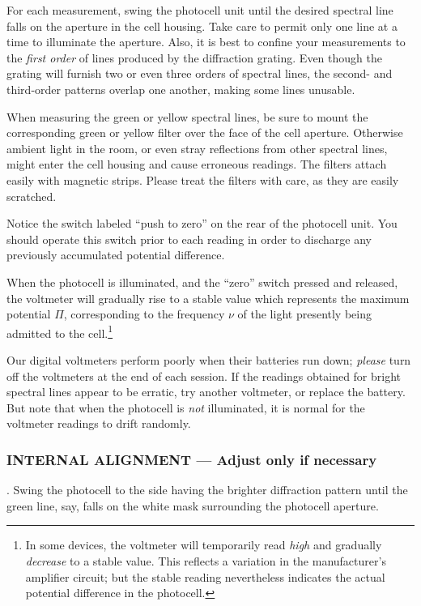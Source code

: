 For each measurement, swing the photocell unit until the desired
spectral line falls on the aperture in the cell housing. Take care to
permit only one line at a time to illuminate the aperture. Also, it is
best to confine your measurements to the \emph{first order} of lines
produced by the diffraction grating. Even though the grating will
furnish two or even three orders of spectral lines, the second- and
third-order patterns overlap one another, making some lines unusable.

When measuring the green or yellow spectral lines, be sure to mount the
corresponding green or yellow filter over the face of the cell aperture.
Otherwise ambient light in the room, or even stray reflections from
other spectral lines, might enter the cell housing and cause erroneous
readings. The filters attach easily with magnetic strips. Please treat
the filters with care, as they are easily scratched.

Notice the switch labeled ``push to zero'' on the rear of the photocell
unit. You should operate this switch prior to each reading in order to
discharge any previously accumulated potential difference.

When the photocell is illuminated, and the ``zero'' switch pressed and
released, the voltmeter will gradually rise to a stable value which
represents the maximum potential $\Pi$, corresponding to the
frequency $\nu$ of the light presently being admitted to the
cell.\footnote{In some devices, the voltmeter will temporarily read
  \emph{high} and gradually \emph{decrease} to a stable value. This
  reflects a variation in the manufacturer's amplifier circuit; but the
  stable reading nevertheless indicates the actual potential difference
  in the photocell.}

Our digital voltmeters perform poorly when their batteries run down;
\emph{please} turn off the voltmeters at the end of each session. If the
readings obtained for bright spectral lines appear to be erratic, try
another voltmeter, or replace the battery. But note that when the
photocell is \emph{not} illuminated, it is normal for the voltmeter
readings to drift randomly.

\subsubsection*{INTERNAL ALIGNMENT --- Adjust only if necessary}

. Swing the photocell to the side having the brighter diffraction
pattern until the green line, say, falls on the white mask surrounding
the photocell aperture.

